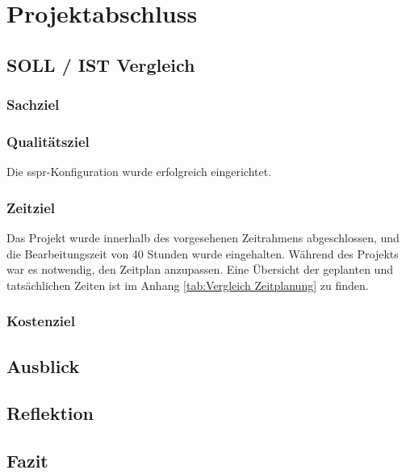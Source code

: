\chapter{Projektabschluss}
\lipsum[1]

\section{SOLL / IST Vergleich}
\lipsum[1]

\subsection{Sachziel}
\lipsum[1]

\subsection{Qualitätsziel}
Die \acrshort{sspr}-Konfiguration wurde erfolgreich eingerichtet. 
\lipsum[1]

\subsection{Zeitziel}
Das Projekt wurde innerhalb des vorgesehenen Zeitrahmens abgeschlossen, und die Bearbeitungszeit von 40 Stunden wurde eingehalten. Während des Projekts war es notwendig, den Zeitplan anzupassen. Eine Übersicht der geplanten und tatsächlichen Zeiten ist im Anhang \grqq{}\ref{tab:Vergleich Zeitplanung}\grqq{} zu finden.



\subsection{Kostenziel}
\lipsum[1]

\section{Ausblick}
\lipsum[1]

\section{Reflektion}
\lipsum[1]

\section{Fazit}
\lipsum[1]
\clearpage

